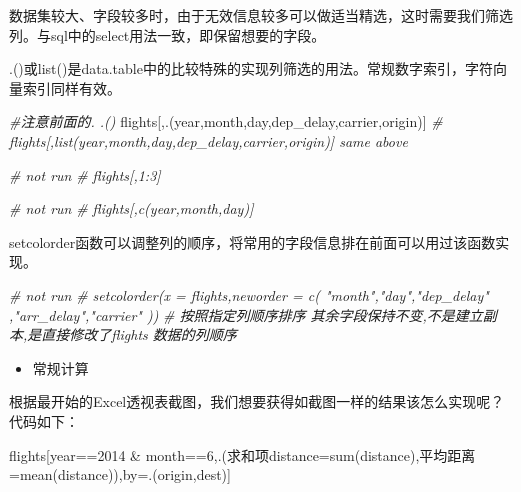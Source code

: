 \documentclass[
]{book}
\newenvironment{Shaded}{\begin{snugshade}}{\end{snugshade}}
\newcommand{\AttributeTok}[1]{\textcolor[rgb]{0.77,0.63,0.00}{#1}}
\newcommand{\CommentTok}[1]{\textcolor[rgb]{0.56,0.35,0.01}{\textit{#1}}}
\newcommand{\DecValTok}[1]{\textcolor[rgb]{0.00,0.00,0.81}{#1}}
\newcommand{\FunctionTok}[1]{\textcolor[rgb]{0.00,0.00,0.00}{#1}}
\newcommand{\NormalTok}[1]{#1}
\newcommand{\OtherTok}[1]{\textcolor[rgb]{0.56,0.35,0.01}{#1}}
\newcommand{\SpecialCharTok}[1]{\textcolor[rgb]{0.00,0.00,0.00}{#1}}
\providecommand{\tightlist}{%
  \setlength{\itemsep}{0pt}\setlength{\parskip}{0pt}}
\begin{document}
数据集较大、字段较多时，由于无效信息较多可以做适当精选，这时需要我们筛选列。与sql中的select用法一致，即保留想要的字段。

.()或list()是data.table中的比较特殊的实现列筛选的用法。常规数字索引，字符向量索引同样有效。

\begin{Shaded}
\begin{Highlighting}[]
\CommentTok{\#注意前面的. .()}
\NormalTok{flights[,.(year,month,day,dep\_delay,carrier,origin)] }
\CommentTok{\# flights[,list(year,month,day,dep\_delay,carrier,origin)]  same above}

\CommentTok{\# not run}
\CommentTok{\# flights[,1:3]}

\CommentTok{\# not run}
\CommentTok{\# flights[,c(\textquotesingle{}year\textquotesingle{},\textquotesingle{}month\textquotesingle{},\textquotesingle{}day\textquotesingle{})]}
\end{Highlighting}
\end{Shaded}

setcolorder函数可以调整列的顺序，将常用的字段信息排在前面可以用过该函数实现。

\begin{Shaded}
\begin{Highlighting}[]
\CommentTok{\# not run}
\CommentTok{\# setcolorder(x = flights,neworder = c( "month","day","dep\_delay" ,"arr\_delay","carrier" )) }
\CommentTok{\# 按照指定列顺序排序 其余字段保持不变,不是建立副本,是直接修改了flights 数据的列顺序}
\end{Highlighting}
\end{Shaded}

\begin{itemize}
\tightlist
\item
  常规计算
\end{itemize}

根据最开始的Excel透视表截图，我们想要获得如截图一样的结果该怎么实现呢？代码如下：

\begin{Shaded}
\begin{Highlighting}[]
\NormalTok{flights[year}\SpecialCharTok{==}\DecValTok{2014} \SpecialCharTok{\&}\NormalTok{ month}\SpecialCharTok{==}\DecValTok{6}\NormalTok{,.(求和项}\AttributeTok{distance=}\FunctionTok{sum}\NormalTok{(distance),平均距离}\OtherTok{=}\FunctionTok{mean}\NormalTok{(distance)),by}\OtherTok{=}\NormalTok{.(origin,dest)]}
\end{Highlighting}
\end{Shaded}
\end{document}
